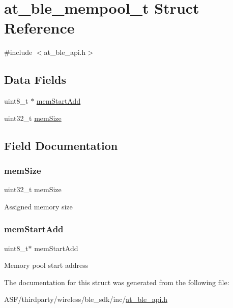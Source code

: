 \hypertarget{structat__ble__mempool__t}{}\section{at\+\_\+ble\+\_\+mempool\+\_\+t Struct Reference}
\label{structat__ble__mempool__t}


{\ttfamily \#include $<$at\+\_\+ble\+\_\+api.\+h$>$}

\subsection*{Data Fields}
\begin{DoxyCompactItemize}
\item 
uint8\+\_\+t $\ast$ \mbox{\hyperlink{structat__ble__mempool__t_a4073d9ae3e6e72d06b7dfd166d93eb73}{mem\+Start\+Add}}
\item 
uint32\+\_\+t \mbox{\hyperlink{structat__ble__mempool__t_a1d56e5453ce89b731040619bac587108}{mem\+Size}}
\end{DoxyCompactItemize}


\subsection{Field Documentation}
\mbox{\label{structat__ble__mempool__t_a1d56e5453ce89b731040619bac587108}} 
\subsubsection{\texorpdfstring{memSize}{memSize}}
{\footnotesize\ttfamily uint32\+\_\+t mem\+Size}

Assigned memory size \mbox{\label{structat__ble__mempool__t_a4073d9ae3e6e72d06b7dfd166d93eb73}} 
\subsubsection{\texorpdfstring{memStartAdd}{memStartAdd}}
{\footnotesize\ttfamily uint8\+\_\+t$\ast$ mem\+Start\+Add}

Memory pool start address 

The documentation for this struct was generated from the following file\+:\begin{DoxyCompactItemize}
\item 
A\+S\+F/thirdparty/wireless/ble\+\_\+sdk/inc/\mbox{\hyperlink{at__ble__api_8h}{at\+\_\+ble\+\_\+api.\+h}}\end{DoxyCompactItemize}
